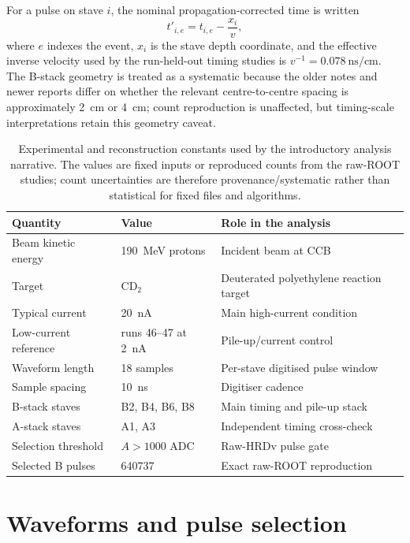 For a pulse on stave $i$, the nominal propagation-corrected time is written
\begin{equation}
  t'_{i,e}=t_{i,e}-\frac{x_i}{v},
  \label{eq:intro-propagation}
\end{equation}
where $e$ indexes the event, $x_i$ is the stave depth coordinate, and the
effective inverse velocity used by the run-held-out timing studies is
$v^{-1}=0.078~\mathrm{ns/cm}$.  The B-stack geometry is treated as a systematic
because the older notes and newer reports differ on whether the relevant
centre-to-centre spacing is approximately \SI{2}{cm} or \SI{4}{cm}; count
reproduction is unaffected, but timing-scale interpretations retain this
geometry caveat.

\begin{table}[H]
\centering
\caption{Experimental and reconstruction constants used by the introductory
analysis narrative.  The values are fixed inputs or reproduced counts from the
raw-ROOT studies; count uncertainties are therefore provenance/systematic
rather than statistical for fixed files and algorithms.}
\label{tab:intro-setup}
\begin{tabular}{lll}
\toprule
Quantity & Value & Role in the analysis \\
\midrule
Beam kinetic energy & \SI{190}{MeV} protons & Incident beam at CCB \\
Target & CD$_2$ & Deuterated polyethylene reaction target \\
Typical current & \SI{20}{nA} & Main high-current condition \\
Low-current reference & runs 46--47 at \SI{2}{nA} & Pile-up/current control \\
Waveform length & 18 samples & Per-stave digitised pulse window \\
Sample spacing & \SI{10}{ns} & Digitiser cadence \\
B-stack staves & B2, B4, B6, B8 & Main timing and pile-up stack \\
A-stack staves & A1, A3 & Independent timing cross-check \\
Selection threshold & $A>1000$ ADC & Raw-HRDv pulse gate \\
Selected B pulses & \num{640737} & Exact raw-ROOT reproduction \\
\bottomrule
\end{tabular}
\end{table}

\section{Waveforms and pulse selection}


